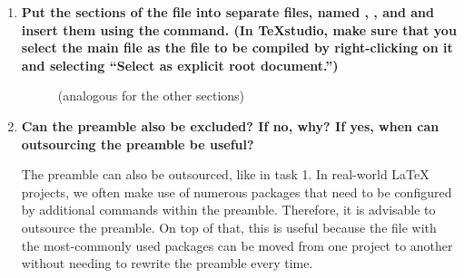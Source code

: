 \begin{enumerate}
	\item 
	 \textbf{Put the sections of the file into separate files, named 
	 , , and  and insert them using the}  \textbf{command. (In TeXstudio, make sure that you select the main file as the file to be compiled by right-clicking on it and selecting \enquote{Select as explicit root document.})}
		
	\begin{figure}[H]
		\caption{}
	\end{figure}
	
	\begin{figure}[H]
		 \caption{ (analogous for the other 
			sections)}
	\end{figure}
	
	\item \textbf{Can the preamble also be excluded? If no, why? If yes, when can outsourcing the preamble be useful?} 

	 The preamble can also be outsourced, like in task 1. In real-world \LaTeX{} projects, we often make use of numerous packages that need to be 
	 configured by additional commands within the preamble. Therefore, it is 
	 advisable to outsource the preamble. On top of that, this is useful 
	 because the file with the most-commonly used packages can be moved from 
	 one project to another without needing to rewrite the preamble every time.
\end{enumerate}